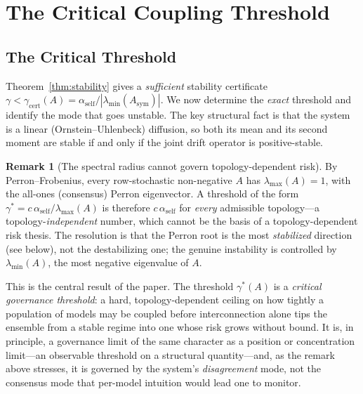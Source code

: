 \documentclass[12pt]{article}
\theoremstyle{plain}
\theoremstyle{definition}
\newtheorem{remark}[theorem]{Remark}
\newcommand{\abs}[1]{\left| #1 \right|}
\begin{document}
\section{The Critical Coupling Threshold}
\label{sec:phase}

\subsection{The Critical Threshold}

Theorem~\ref{thm:stability} gives a \emph{sufficient} stability certificate
$\gamma < \gamma_{\mathrm{cert}}(A) = \alpha_{\mathrm{self}}/\abs{\lambda_{\min}(A_{\mathrm{sym}})}$.
We now determine the \emph{exact} threshold and identify the mode that goes
unstable.  The key structural fact is that the system is a linear
(Ornstein--Uhlenbeck) diffusion, so both its mean and its second moment are
stable if and only if the joint drift operator is positive-stable.

\begin{remark}[The spectral radius cannot govern topology-dependent risk]
\label{rem:perron}
By Perron--Frobenius, every row-stochastic non-negative $A$ has
$\lambda_{\max}(A)=1$, with the all-ones (consensus) Perron eigenvector.
A threshold of the form $\gamma^*=c\,\alpha_{\mathrm{self}}/\lambda_{\max}(A)$
is therefore $c\,\alpha_{\mathrm{self}}$ for \emph{every} admissible
topology---a topology-\emph{independent} number, which cannot be the basis
of a topology-dependent risk thesis.  The resolution is that the Perron
root is the most \emph{stabilized} direction (see below), not the
destabilizing one; the genuine instability is controlled by
$\lambda_{\min}(A)$, the most negative eigenvalue of $A$.
\end{remark}

This is the central result of the paper. The threshold $\gamma^*(A)$ is a \emph{critical governance threshold}: a hard, topology-dependent ceiling on how tightly a population of models may be coupled before interconnection alone tips the ensemble from a stable regime into one whose risk grows without bound. It is, in principle, a governance limit of the same character as a position or concentration limit---an observable threshold on a structural quantity---and, as the remark above stresses, it is governed by the system's \emph{disagreement} mode, not the consensus mode that per-model intuition would lead one to monitor.
\end{document}
